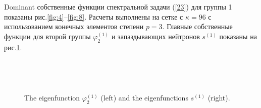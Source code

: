 \documentclass[authoryear]{elsarticle}
\begin{document}
Dominant собственные функции спектральной задачи (\ref{23}) для группы 1 показаны рис.\ref{fig:4}--\ref{fig:8}. 
Расчеты выполнены на сетке с $\kappa=96$ с использованием конечных элементов степени $p=3$.
Главные собственные функции для второй группы $\varphi^{(1)}_2$ и запаздывающих нейтронов $s^{(1)}$  показаны на  
рис.\ref{fig:9}. 

\begin{figure}[!h]
  \begin{center}
\begin{minipage}{0.49\linewidth}
 \\
\end{minipage}
\hfill
\begin{minipage}{0.49\linewidth}
 \\
\end{minipage}
\caption{The eigenfunction $\varphi^{(1)}_2$ (left) and the eigenfunctions $s^{(1)}$  (right).}
\label{fig:9}
  \end{center}
\end{figure}
\end{document}
